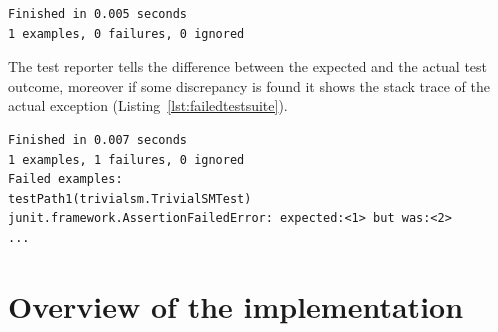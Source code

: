 \begin{description}
\begin{lstlisting}[label={lst:successfultestsuite}, caption=Successful test suite execution output,breaklines=true]
Finished in 0.005 seconds
1 examples, 0 failures, 0 ignored
\end{lstlisting}
	
	The test reporter tells the difference between the expected and the actual test outcome, moreover if some discrepancy is found it shows the stack trace of the actual exception (Listing~\ref{lst:failedtestsuite}).

\begin{lstlisting}[label={lst:failedtestsuite}, caption=Failed test suite execution output,breaklines=true]
Finished in 0.007 seconds
1 examples, 1 failures, 0 ignored
Failed examples:
testPath1(trivialsm.TrivialSMTest)
junit.framework.AssertionFailedError: expected:<1> but was:<2>
...
\end{lstlisting}
	
\end{description}
	

\newpage

\section{Overview of the implementation}
\label{sec:implementationoverview}



